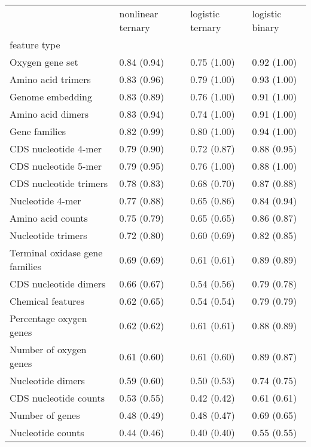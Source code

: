 \begin{tabular}{llll}
\toprule
 & nonlinear ternary & logistic ternary & logistic binary \\
feature type &  &  &  \\
\midrule
Oxygen gene set & 0.84 (0.94) & 0.75 (1.00) & 0.92 (1.00) \\
Amino acid trimers & 0.83 (0.96) & 0.79 (1.00) & 0.93 (1.00) \\
Genome embedding & 0.83 (0.89) & 0.76 (1.00) & 0.91 (1.00) \\
Amino acid dimers & 0.83 (0.94) & 0.74 (1.00) & 0.91 (1.00) \\
Gene families & 0.82 (0.99) & 0.80 (1.00) & 0.94 (1.00) \\
CDS nucleotide 4-mer & 0.79 (0.90) & 0.72 (0.87) & 0.88 (0.95) \\
CDS nucleotide 5-mer & 0.79 (0.95) & 0.76 (1.00) & 0.88 (1.00) \\
CDS nucleotide trimers & 0.78 (0.83) & 0.68 (0.70) & 0.87 (0.88) \\
Nucleotide 4-mer & 0.77 (0.88) & 0.65 (0.86) & 0.84 (0.94) \\
Amino acid counts & 0.75 (0.79) & 0.65 (0.65) & 0.86 (0.87) \\
Nucleotide trimers & 0.72 (0.80) & 0.60 (0.69) & 0.82 (0.85) \\
Terminal oxidase gene families & 0.69 (0.69) & 0.61 (0.61) & 0.89 (0.89) \\
CDS nucleotide dimers & 0.66 (0.67) & 0.54 (0.56) & 0.79 (0.78) \\
Chemical features & 0.62 (0.65) & 0.54 (0.54) & 0.79 (0.79) \\
Percentage oxygen genes & 0.62 (0.62) & 0.61 (0.61) & 0.88 (0.89) \\
Number of oxygen genes & 0.61 (0.60) & 0.61 (0.60) & 0.89 (0.87) \\
Nucleotide dimers & 0.59 (0.60) & 0.50 (0.53) & 0.74 (0.75) \\
CDS nucleotide counts & 0.53 (0.55) & 0.42 (0.42) & 0.61 (0.61) \\
Number of genes & 0.48 (0.49) & 0.48 (0.47) & 0.69 (0.65) \\
Nucleotide counts & 0.44 (0.46) & 0.40 (0.40) & 0.55 (0.55) \\
\bottomrule
\end{tabular}
